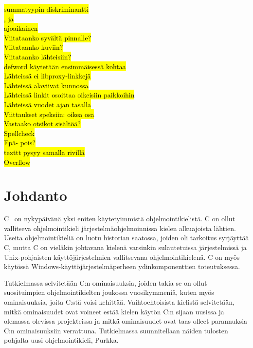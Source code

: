 \hl{summatyypin diskriminantti} \\
\hl{, ja} \\
\hl{ajoaikainen} \\
\hl{Viitataanko syvältä pinnalle?} \\
\hl{Viitataanko kuviin?} \\
\hl{Viitataanko lähteisiin?} \\
\hl{defword käytetään ensimmäisessä kohtaa} \\
\hl{Lähteissä ei libproxy-linkkejä} \\
\hl{Lähteissä alaviivat kunnossa} \\
\hl{Lähteissä linkit osoittaa oikeisiin paikkoihin} \\
\hl{Lähteissä vuodet ajan tasalla} \\
\hl{Viittaukset speksiin: oikea osa} \\
\hl{Vastaako otsikot sisältöä?} \\
\hl{Spellcheck} \\
\hl{Epä- pois?} \\
\hl{texttt pysyy samalla rivillä} \\
\hl{Overflow} \\

\newpage

\section{Johdanto}

C~\citep{C18} on nykypäivänä yksi eniten käytetyimmistä ohjelmointikielistä. C
on ollut vallitseva ohjelmointikieli järjestelmäohjelmoinnissa kielen
alkuajoista lähtien. Useita ohjelmointikieliä on luotu historian saatossa,
joiden oli tarkoitus syrjäyttää C, mutta C on vieläkin johtavana kielenä
varsinkin sulautetuissa järjestelmissä ja Unix-pohjaisten käyttöjärjestelmien
vallitsevana ohjelmointikielenä. C on myös käytössä
Windows-käyttöjärjestelmäperheen ydinkomponenttien toteutuksessa.

Tutkielmassa selvitetään C:n ominaisuuksia, joiden takia se on ollut
suosituimpien ohjelmointikielten joukossa vuosikymmeniä, kuten myös
ominaisuuksia, joita C:stä voisi kehittää. Vaihtoehtoisista kielistä
selvitetään, mitkä ominaisuudet ovat voineet estää kielen käytön C:n sijaan
uusissa ja olemassa olevissa projekteissa ja mitkä ominaisuudet ovat taas
olleet parannuksia C:n ominaisuuksiin verrattuna. Tutkielmassa suunnitellaan
näiden tulosten pohjalta uusi ohjelmointikieli, Purkka.

